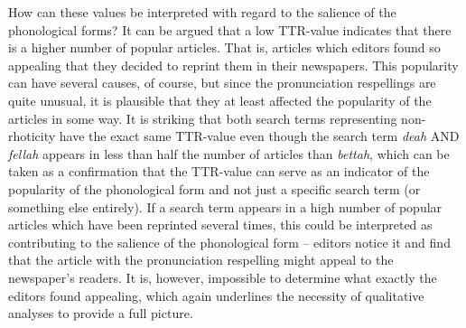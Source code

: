 How can these values be interpreted with regard to the salience of the phonological forms? It can be argued that a low TTR-value indicates that there is a higher number of popular articles. That is, articles which editors found so appealing that they decided to reprint them in their newspapers. This popularity can have several causes, of course, but since the pronunciation respellings are quite unusual, it is plausible that they at least affected the popularity of the articles in some way. It is striking that both search terms representing non-rhoticity have the exact same TTR-value even though the search term \emph{deah} AND \emph{fellah} appears in less than half the number of articles than \emph{bettah}, which can be taken as a confirmation that the TTR-value can serve as an indicator of the popularity of the phonological form and not just a specific search term (or something else entirely). If a search term appears in a high number of popular articles which have been reprinted several times, this could be interpreted as contributing to the salience of the phonological form – editors notice it and find that the article with the pronunciation respelling might appeal to the newspaper’s readers. It is, however, impossible to determine what exactly the editors found appealing, which again underlines the necessity of qualitative analyses to provide a full picture.

\begin{table}
\caption{
Ratio of number of articles containing the search term(s) written in non-standard spelling (ANSSs) and in standard spelling (ASSs).
}
\label{tab:key:10}
\end{table}

